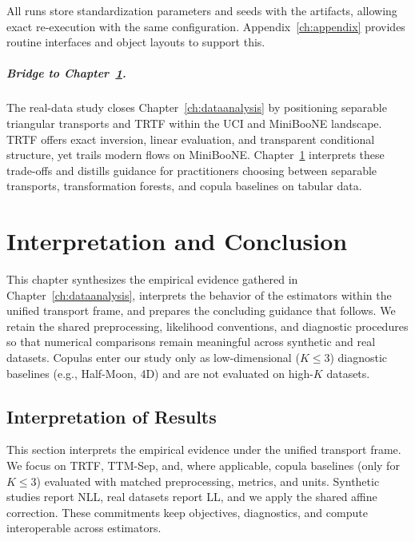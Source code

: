 \documentclass[11pt,a4paper,twoside]{book}\usepackage[]{graphicx}\usepackage[]{xcolor}
\begin{document}
All runs store standardization parameters and seeds with the artifacts, allowing exact re-execution with the same configuration. Appendix~\ref{ch:appendix} provides routine interfaces and object layouts to support this.

\paragraph{Bridge to Chapter~\ref{ch:conclusion}.} The real-data study closes Chapter~\ref{ch:dataanalysis} by positioning separable triangular transports and TRTF within the UCI and MiniBooNE landscape. TRTF offers exact inversion, linear evaluation, and transparent conditional structure, yet trails modern flows on MiniBooNE. Chapter~\ref{ch:conclusion} interprets these trade-offs and distills guidance for practitioners choosing between separable transports, transformation forests, and copula baselines on tabular data.





\chapter{Interpretation and Conclusion}\label{ch:conclusion}

This chapter synthesizes the empirical evidence gathered in Chapter~\ref{ch:dataanalysis}, interprets the behavior of the estimators within the unified transport frame, and prepares the concluding guidance that follows. We retain the shared preprocessing, likelihood conventions, and diagnostic procedures so that numerical comparisons remain meaningful across synthetic and real datasets. Copulas enter our study only as low-dimensional ($K\!\le\!3$) diagnostic baselines (e.g., Half-Moon, 4D) and are not evaluated on high-$K$ datasets.

\section{Interpretation of Results}\label{sec:interpretation-results}
This section interprets the empirical evidence under the unified transport frame. We focus on TRTF, TTM-Sep, and, where applicable, copula baselines (only for $K\!\le\!3$) evaluated with matched preprocessing, metrics, and units. Synthetic studies report NLL, real datasets report LL, and we apply the shared affine correction. These commitments keep objectives, diagnostics, and compute interoperable across estimators.
\end{document}
